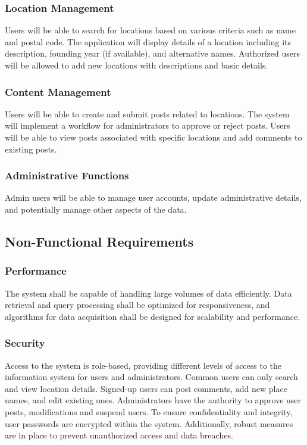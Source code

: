 \subsubsection{Location Management}
Users will be able to search for locations based on various criteria such as name and postal code. The application will display details of a location including its description, founding year (if available), and alternative names. Authorized users will be allowed to add new locations with descriptions and basic details.

\subsubsection{Content Management}
Users will be able to create and submit posts related to locations. The system will implement a workflow for administrators to approve or reject posts. Users will be able to view posts associated with specific locations and add comments to existing posts.

\subsubsection{Administrative Functions}
Admin users will be able to manage user accounts, update administrative details, and potentially manage other aspects of the data.

\subsection{Non-Functional Requirements}

\subsubsection{Performance}
The system shall be capable of handling large volumes of data efficiently. Data retrieval and query processing shall be optimized for responsiveness, and algorithms for data acquisition shall be designed for scalability and performance.

\subsubsection{Security}
Access to the system is role-based, providing different levels of access to the information system for users and administrators. Common users can only search and view location details. Signed-up users can post comments, add new place names, and edit existing ones. Administrators have the authority to approve user posts, modifications and suspend users. To ensure confidentiality and integrity, user passwords are encrypted within the system. Additionally, robust measures are in place to prevent unauthorized access and data breaches.


